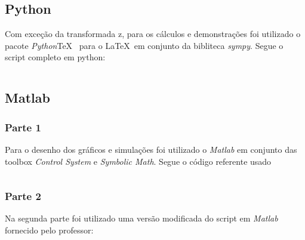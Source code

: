 \documentclass[a4paper,11pt]{article}
\begin{document}
\subsection*{Python}

Com exceção da transformada z, para os cálculos e demonstrações foi utilizado o pacote \textit{Python}\TeX\ \cite{pythontex} para o \LaTeX\ em conjunto da bibliteca \textit{sympy}\cite{sympy}. Segue o script completo em python:

\inputminted[xleftmargin=15pt,linenos,frame=single,framesep=5pt]{python}{../python/exsim2.py}

\newpage
\subsection*{Matlab}

\subsubsection*{Parte 1}
Para o desenho dos gráficos e simulações foi utilizado o \textit{Matlab} em conjunto das toolbox \textit{Control System}\cite{matlabcontrol} e \textit{Symbolic Math}\cite{matlabsymbolic}. Segue o código referente usado

\inputminted[xleftmargin=15pt,linenos,frame=single,framesep=5pt]{matlab}{../matlab/exsim2/exsim2.m}

\subsubsection*{Parte 2}
Na segunda parte foi utilizado uma versão modificada do script em \textit{Matlab} fornecido pelo professor:
\inputminted[xleftmargin=15pt,linenos,frame=single,framesep=5pt]{matlab}{../matlab/exsim2/exsim2script.m}



\end{document}
